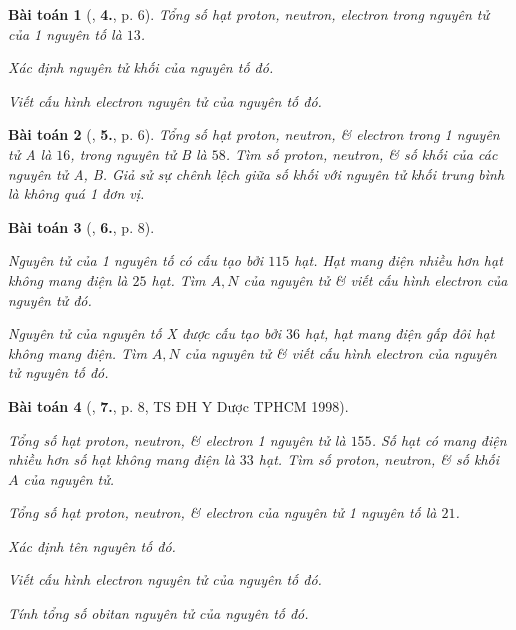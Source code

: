 \documentclass{article}
\numberwithin{equation}{section}
\newtheorem{baitoan}{Bài toán}[section]
\begin{document}
\begin{baitoan}[\cite{An2012}, \textbf{4.}, p. 6]
	Tổng số hạt proton, neutron, electron trong nguyên tử của 1 nguyên tố là $13$.
	\begin{enumerate*}
		\item[(a)] Xác định nguyên tử khối của nguyên tố đó.
		\item[(b)] Viết cấu hình electron nguyên tử của nguyên tố đó.
	\end{enumerate*}
\end{baitoan}

\begin{baitoan}[\cite{An2012}, \textbf{5.}, p. 6]
	Tổng số hạt proton, neutron, \& electron trong 1 nguyên tử A là $16$, trong nguyên tử B là $58$. Tìm số proton, neutron, \& số khối của các nguyên tử A, B. Giả sử sự chênh lệch giữa số khối với nguyên tử khối trung bình là không quá 1 đơn vị.
\end{baitoan}

\begin{baitoan}[\cite{An2012}, \textbf{6.}, p. 8]
	\begin{enumerate*}
		\item[(a)] Nguyên tử của 1 nguyên tố có cấu tạo bởi $115$ hạt. Hạt mang điện nhiều hơn hạt không mang điện là $25$ hạt. Tìm $A,N$ của nguyên tử \& viết cấu hình electron của nguyên tử đó.
		\item[(b)] Nguyên tử của nguyên tố X được cấu tạo bởi $36$ hạt, hạt mang điện gấp đôi hạt không mang điện. Tìm $A,N$ của nguyên tử \& viết cấu hình electron của nguyên tử nguyên tố đó.
	\end{enumerate*}
\end{baitoan}

\begin{baitoan}[\cite{An2012}, \textbf{7.}, p. 8, TS ĐH Y Dược TPHCM 1998]
	\begin{enumerate*}
		\item[(a)] Tổng số hạt proton, neutron, \& electron 1 nguyên tử là $155$. Số hạt có mang điện nhiều hơn số hạt không mang điện là $33$ hạt. Tìm số proton, neutron, \& số khối $A$ của nguyên tử.
		\item[(b)] Tổng số hạt proton, neutron, \& electron của nguyên tử 1 nguyên tố là $21$.
		\item[\textbf{1.}] Xác định tên nguyên tố đó.
		\item[\textbf{2.}] Viết cấu hình electron nguyên tử của nguyên tố đó.
		\item[\textbf{3.}] Tính tổng số obitan nguyên tử của nguyên tố đó.
	\end{enumerate*}
\end{baitoan}
\end{document}
